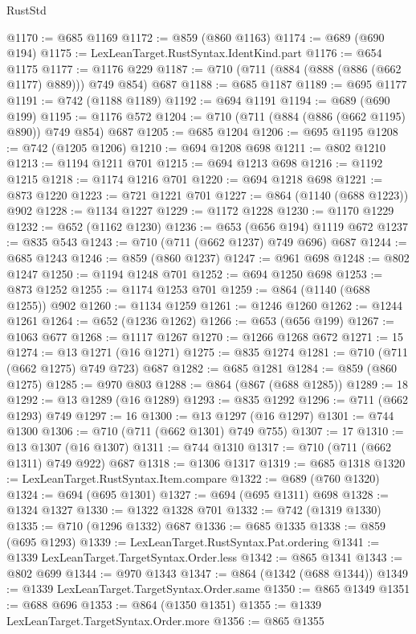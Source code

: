 \begin{lexlean}{RustStd}
\begin{coremodule}
@1170 := @685 @1169
@1172 := @859 (@860 @1163)
@1174 := @689 (@690 @194)
@1175 := LexLeanTarget.RustSyntax.IdentKind.part
@1176 := @654 @1175
@1177 := @1176 @229
@1187 := @710 (@711 (@884 (@888 (@886 (@662 @1177) @889))) @749 @854) @687
@1188 := @685 @1187
@1189 := @695 @1177
@1191 := @742 (@1188 @1189)
@1192 := @694 @1191
@1194 := @689 (@690 @199)
@1195 := @1176 @572
@1204 := @710 (@711 (@884 (@886 (@662 @1195) @890)) @749 @854) @687
@1205 := @685 @1204
@1206 := @695 @1195
@1208 := @742 (@1205 @1206)
@1210 := @694 @1208 @698
@1211 := @802 @1210
@1213 := @1194 @1211 @701
@1215 := @694 @1213 @698
@1216 := @1192 @1215
@1218 := @1174 @1216 @701
@1220 := @694 @1218 @698
@1221 := @873 @1220
@1223 := @721 @1221 @701
@1227 := @864 (@1140 (@688 @1223)) @902
@1228 := @1134 @1227
@1229 := @1172 @1228
@1230 := @1170 @1229
@1232 := @652 (@1162 @1230)
@1236 := @653 (@656 @194) @1119 @672
@1237 := @835 @543
@1243 := @710 (@711 (@662 @1237) @749 @696) @687
@1244 := @685 @1243
@1246 := @859 (@860 @1237)
@1247 := @961 @698
@1248 := @802 @1247
@1250 := @1194 @1248 @701
@1252 := @694 @1250 @698
@1253 := @873 @1252
@1255 := @1174 @1253 @701
@1259 := @864 (@1140 (@688 @1255)) @902
@1260 := @1134 @1259
@1261 := @1246 @1260
@1262 := @1244 @1261
@1264 := @652 (@1236 @1262)
@1266 := @653 (@656 @199)
@1267 := @1063 @677
@1268 := @1117 @1267
@1270 := @1266 @1268 @672
@1271 := 15
@1274 := @13 @1271 (@16 @1271)
@1275 := @835 @1274
@1281 := @710 (@711 (@662 @1275) @749 @723) @687
@1282 := @685 @1281
@1284 := @859 (@860 @1275)
@1285 := @970 @803
@1288 := @864 (@867 (@688 @1285))
@1289 := 18
@1292 := @13 @1289 (@16 @1289)
@1293 := @835 @1292
@1296 := @711 (@662 @1293) @749
@1297 := 16
@1300 := @13 @1297 (@16 @1297)
@1301 := @744 @1300
@1306 := @710 (@711 (@662 @1301) @749 @755)
@1307 := 17
@1310 := @13 @1307 (@16 @1307)
@1311 := @744 @1310
@1317 := @710 (@711 (@662 @1311) @749 @922) @687
@1318 := @1306 @1317
@1319 := @685 @1318
@1320 := LexLeanTarget.RustSyntax.Item.compare
@1322 := @689 (@760 @1320)
@1324 := @694 (@695 @1301)
@1327 := @694 (@695 @1311) @698
@1328 := @1324 @1327
@1330 := @1322 @1328 @701
@1332 := @742 (@1319 @1330)
@1335 := @710 (@1296 @1332) @687
@1336 := @685 @1335
@1338 := @859 (@695 @1293)
@1339 := LexLeanTarget.RustSyntax.Pat.ordering
@1341 := @1339 LexLeanTarget.TargetSyntax.Order.less
@1342 := @865 @1341
@1343 := @802 @699
@1344 := @970 @1343
@1347 := @864 (@1342 (@688 @1344))
@1349 := @1339 LexLeanTarget.TargetSyntax.Order.same
@1350 := @865 @1349
@1351 := @688 @696
@1353 := @864 (@1350 @1351)
@1355 := @1339 LexLeanTarget.TargetSyntax.Order.more
@1356 := @865 @1355

\end{coremodule}
\end{lexlean}

